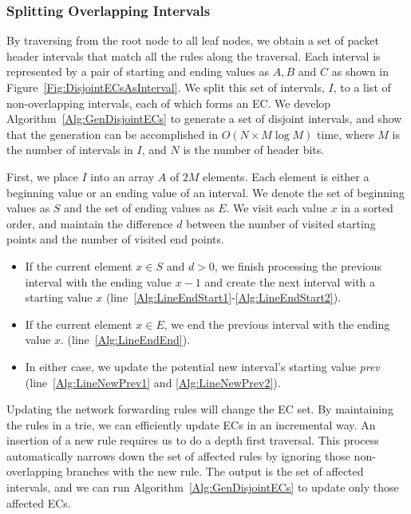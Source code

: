 \subsubsection{Splitting Overlapping Intervals}
By traversing from the root node to all leaf nodes, we obtain a set of packet header intervals that match all the rules along the traversal. Each interval is represented by a pair of starting and ending values as $A, B$ and $C$ as shown in Figure~\ref{Fig:DisjointECsAsInterval}. We split this set of intervals, $I$, to a list of non-overlapping intervals, each of which forms an EC. %
We develop Algorithm~\ref{Alg:GenDisjointECs} to generate a set of disjoint intervals, and show that the generation can be accomplished in $O(N \times M\log M)$ time,
where $M$ is the number of intervals in $I$, and $N$ is the number of header bits.

First, we place $I$ into an array $A$ of $2M$ elements. Each element is either a beginning value or an ending value of an interval. We denote the set of beginning values as $S$ and the set of ending values as $E$. We visit each value $x$ in a sorted order, and maintain the difference $d$ between the number of visited starting points and the number of visited end points.
\begin{itemize}
\item If the current element $x \in S$ and $d > 0$,
        we finish processing the previous interval with the ending value $x - 1$ and
        create the next interval with a starting value $x$
        (line~\ref{Alg:LineEndStart1}-\ref{Alg:LineEndStart2}).
\item If the current element $x \in E$, we end the previous interval with the ending value $x$.
        (line~\ref{Alg:LineEndEnd}).
\item In either case, we update the potential new interval's starting value \textit{prev}
        (line~\ref{Alg:LineNewPrev1} and \ref{Alg:LineNewPrev2}).
\end{itemize}

Updating the network forwarding rules will change the EC set.
By maintaining the rules in a trie, we can efficiently update ECs in an incremental way. An insertion of a new rule requires us to do a depth first traversal. This process automatically narrows down the set of affected rules by ignoring those non-overlapping branches with the new rule.
The output is the set of affected intervals, and we can run Algorithm~\ref{Alg:GenDisjointECs} to update only those affected ECs.

